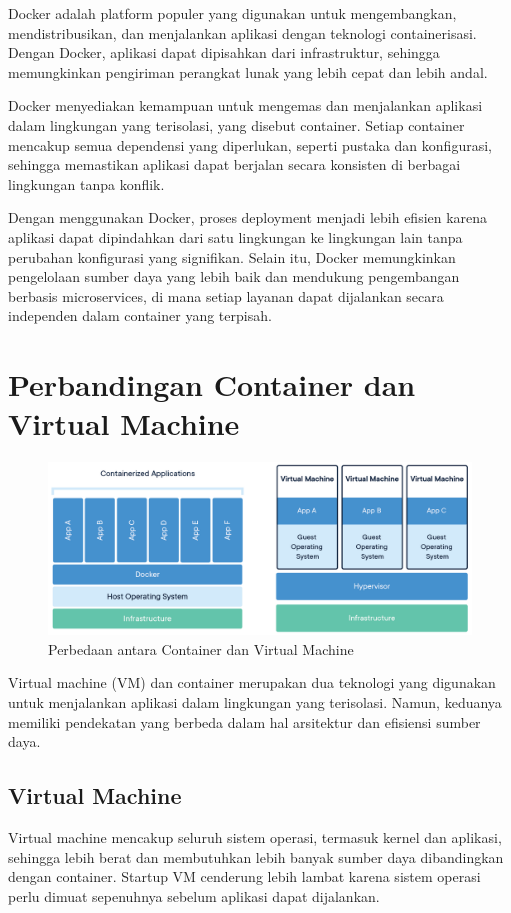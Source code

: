 Docker adalah platform populer yang digunakan untuk mengembangkan, mendistribusikan, dan menjalankan aplikasi dengan teknologi containerisasi. Dengan Docker, aplikasi dapat dipisahkan dari infrastruktur, sehingga memungkinkan pengiriman perangkat lunak yang lebih cepat dan lebih andal.

Docker menyediakan kemampuan untuk mengemas dan menjalankan aplikasi dalam lingkungan yang terisolasi, yang disebut container. Setiap container mencakup semua dependensi yang diperlukan, seperti pustaka dan konfigurasi, sehingga memastikan aplikasi dapat berjalan secara konsisten di berbagai lingkungan tanpa konflik.

Dengan menggunakan Docker, proses deployment menjadi lebih efisien karena aplikasi dapat dipindahkan dari satu lingkungan ke lingkungan lain tanpa perubahan konfigurasi yang signifikan. Selain itu, Docker memungkinkan pengelolaan sumber daya yang lebih baik dan mendukung pengembangan berbasis microservices, di mana setiap layanan dapat dijalankan secara independen dalam container yang terpisah.




\section{Perbandingan Container dan Virtual Machine}

\begin{figure}[h]
	\centering
	\includegraphics[width=\textwidth]{../images/container-vm.png}
	\caption{Perbedaan antara Container dan Virtual Machine}
	\label{fig:container-vm}
\end{figure}

Virtual machine (VM) dan container merupakan dua teknologi yang digunakan untuk menjalankan aplikasi dalam lingkungan yang terisolasi. Namun, keduanya memiliki pendekatan yang berbeda dalam hal arsitektur dan efisiensi sumber daya.

\subsection{Virtual Machine}
Virtual machine mencakup seluruh sistem operasi, termasuk kernel dan aplikasi, sehingga lebih berat dan membutuhkan lebih banyak sumber daya dibandingkan dengan container. Startup VM cenderung lebih lambat karena sistem operasi perlu dimuat sepenuhnya sebelum aplikasi dapat dijalankan.


